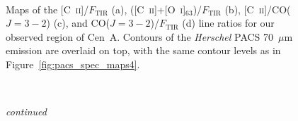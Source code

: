 \begin{figure}[!htbp]
\\
\caption[Maps of important cooling line ratios of Centaurus~A]{Maps of the [C~\textsc{ii}]/$F_{\mathrm{TIR}}$ (a), ([C~\textsc{ii}]+[O~\textsc{i}]$_{63}$)/$F_{\mathrm{TIR}}$ (b), [C~\textsc{ii}]/CO($J=3-2$) (c), and CO($J=3-2$)/$F_{\mathrm{TIR}}$ (d) line ratios for our observed region of Cen~A.  Contours of the \emph{Herschel} PACS 70~$\mu$m emission are overlaid on top, with the same contour levels as in Figure~\ref{fig:pacs_spec_maps4}.}
\label{fig:cena_ratios}
\end{figure}
\begin{figure}[!htbp]
\ContinuedFloat
{}\\
\caption[]{\emph{continued}}
\end{figure}

